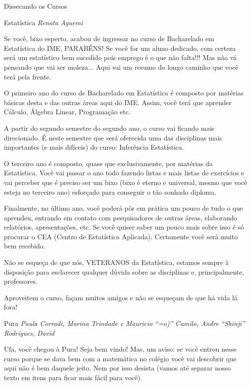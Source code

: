 \begin{secao}{Dissecando os Cursos}
\begin{subsecao}{Estatística}
{\em Renata Aguemi}

Se você, bixo esperto, acabou de ingressar no curso de Bacharelado em Estatística do IME, PARABÉNS! Se você for um aluno dedicado, com certeza será um estatístico bem sucedido pois emprego é o que não falta!!! Mas não vá pensando que vai ser moleza... Aqui vai um resumo do longo caminho que você terá pela frente.

O primeiro ano do curso de Bacharelado em Estatística é composto por matérias básicas desta e das outras áreas aqui do IME. Assim, você terá que aprender Cálculo, Álgebra Linear, Programação etc.

A partir do segundo semestre do segundo ano, o curso vai ficando mais direcionado. É neste semestre que será oferecida uma das disciplinas mais importantes (e mais difíceis) do curso: Inferência Estatística.

O terceiro ano é composto, quase que exclusivamente, por matérias da Estatística. Você vai passar o ano todo fazendo listas e mais listas de exercícios e vai perceber que é preciso ser um bixo (bixo é eterno e universal, mesmo que você esteja no terceiro ano) esforçado para conseguir o tão sonhado diploma.

Finalmente, no último ano, você poderá pôr em prática um pouco de tudo o que aprendeu, entrando em contato com pesquisadores de outras áreas, elaborando relatórios, apresentações, etc. Se você quiser saber um pouco mais sobre isso é só procurar o CEA (Centro de Estatística Aplicada). Certamente você será muito bem recebido.

Não se esqueça de que nós, VETERANOS da Estatística, estamos sempre à disposição para esclarecer qualquer dúvida sobre as disciplinas e, principalmente, professores.

Aproveitem o curso, façam muitos amigos e não se esqueçam de que há vida lá fora!

\end{subsecao}


\begin{subsecao}{Pura}
{\em Paula Corradi, Marina Trindade e Mauricio ``=o)'' Camilo, Andre “Shinji” Rodrigues, David}


Ufa, você chegou à Pura! Seja bem vindo! Mas, um aviso: se você entrou nesse curso porque se dava bem com a matemática no colégio você vai descobrir que aqui não é bem daquele jeito. Nem por isso desista (vamos até separar nosso texto em itens para ficar mais fácil para você).


\end{subsecao}
\end{secao}

